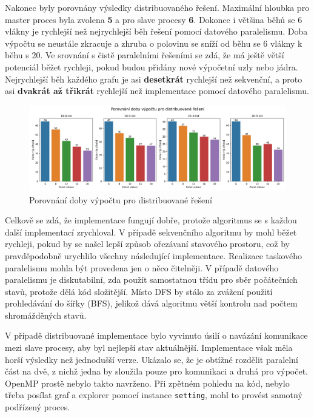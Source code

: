 Nakonec byly porovnány výsledky distribuovaného řešení.
Maximální hloubka pro master proces byla zvolena \textbf{5} a pro slave procesy \textbf{6}.
Dokonce i většina běhů se 6 vlákny je rychlejší než nejrychlejší běh řešení pomocí datového paralelismu.
Doba výpočtu se neustále zkracuje a zhruba o polovinu se sníží od běhu se 6 vlákny k běhu s 20.
Ve srovnání s čistě paralelními řešeními se zdá, že má ještě větší potenciál běžet rychleji, pokud budou přidány nové výpočetní uzly nebo jádra.
Nejrychlejší běh každého grafu je asi \textbf{desetkrát} rychlejší než sekvenční, a proto asi \textbf{dvakrát až třikrát} rychlejší než implementace pomocí datového paralelismu.

\begin{figure}[!htbp]
\centerline{\includegraphics[scale=0.52]{report/images/distrib-graph.png}}
\caption{Porovnání doby výpočtu pro distribuované řešení}
\label{fig:distrib-graph.png}
\end{figure}
\FloatBarrier

Celkově se zdá, že implementace fungují dobře, protože algoritmus se s každou další implementací zrychloval.
V případě sekvenčního algoritmu by mohl běžet rychleji, pokud by se našel lepší způsob ořezávaní stavového prostoru, což by pravděpodobně urychlilo všechny následující implementace.
Realizace taskového paralelismu mohla být provedena jen o něco čitelněji.
V případě datového paralelismu je diskutabilní, zda použít samostatnou třídu pro sběr počátečních stavů, protože dělá kód složitější.
Místo DFS by stálo za zvážení použití prohledávání do šířky (BFS), jelikož dává algoritmu větší kontrolu nad počtem shromážděných stavů.

V případě distribuované implementace bylo vyvinuto úsilí o navázání komunikace mezi slave procesy, aby byl nejlepší stav aktuálnější.
Implementace však měla horší výsledky než jednodušší verze.
Ukázalo se, že je obtížné rozdělit paralelní část na dvě, z nichž jedna by sloužila pouze pro komunikaci a druhá pro výpočet.
OpenMP prostě nebylo takto navrženo.
Při zpětném pohledu na kód, nebylo třeba posílat graf a explorer pomocí instance \texttt{setting}, mohl to provést samotný podřízený proces.









